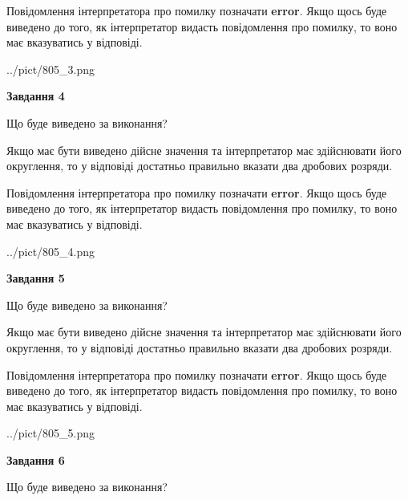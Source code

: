 \documentclass[12pt, ukrainian]{article}
\begin{document}
{\begin {Large}
Повідомлення інтерпретатора про помилку позначати \textbf{error}.
Якщо щось буде виведено до того, як інтерпретатор видасть повідомлення про помилку, 
то воно має вказуватись у відповіді. \par

\begin{center}
	{../pict/805_3.png}
\end{center}
\newpage

{\begin {center}\textbf{Завдання 4}\end {center}}\par
Що буде виведено за виконання? \par

Якщо має бути виведено дійсне значення та інтерпретатор має здійснювати його округлення, 
то у відповіді достатньо правильно вказати два дробових розряди.

Повідомлення інтерпретатора про помилку позначати \textbf{error}.
Якщо щось буде виведено до того, як інтерпретатор видасть повідомлення про помилку, 
то воно має вказуватись у відповіді. \par

\begin{center}
	{../pict/805_4.png}
\end{center}
\newpage

{\begin {center}\textbf{Завдання 5}\end {center}}\par
Що буде виведено за виконання? \par

Якщо має бути виведено дійсне значення та інтерпретатор має здійснювати його округлення, 
то у відповіді достатньо правильно вказати два дробових розряди.

Повідомлення інтерпретатора про помилку позначати \textbf{error}.
Якщо щось буде виведено до того, як інтерпретатор видасть повідомлення про помилку, 
то воно має вказуватись у відповіді. \par

\begin{center}
	{../pict/805_5.png}
\end{center}
\newpage

{\begin {center}\textbf{Завдання 6}\end {center}}\par
Що буде виведено за виконання? \par


\end{Large}}
\end{document}
